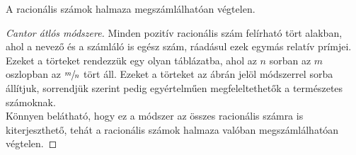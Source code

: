 \begin{theorem}
  A racionális számok halmaza megszámlálhatóan végtelen.

  \begin{proof}[Cantor átlós módszere]
    \begin{minipage}{.5\textwidth}
      Minden pozitív racionális szám felírható tört alakban, ahol a nevező és a
      számláló is egész szám, ráadásul ezek egymás relatív prímjei.
      \\[.33em]
      Ezeket a törteket rendezzük egy olyan táblázatba, ahol az $n$ sorban az
      $m$ oszlopban az $\sfrac{m}{n}$ tört áll. Ezeket a törteket az ábrán
      jelöl módszerrel sorba állítjuk, sorrendjük szerint pedig egyértelműen
      megfeleltethetők a természetes számoknak.
      \\[.33em]
      Könnyen belátható, hogy ez a módszer az összes racionális számra
      is kiterjeszthető, tehát a racionális számok halmaza valóban
      megszámlálhatóan végtelen.
    \end{minipage}\hfill%
    \begin{minipage}{.4\textwidth}
    \end{minipage}
  \end{proof}
\end{theorem}

